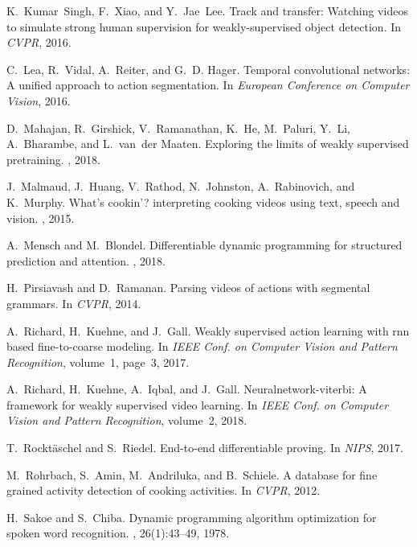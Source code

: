 \documentclass[10pt,twocolumn,letterpaper]{article}
\begin{document}
{\begin{thebibliography}{10}
K.~Kumar~Singh, F.~Xiao, and Y.~Jae~Lee.
\newblock Track and transfer: Watching videos to simulate strong human
  supervision for weakly-supervised object detection.
\newblock In {\em CVPR}, 2016.

C.~Lea, R.~Vidal, A.~Reiter, and G.~D. Hager.
\newblock Temporal convolutional networks: A unified approach to action
  segmentation.
\newblock In {\em European Conference on Computer Vision}, 2016.

D.~Mahajan, R.~Girshick, V.~Ramanathan, K.~He, M.~Paluri, Y.~Li, A.~Bharambe,
  and L.~van~der Maaten.
\newblock Exploring the limits of weakly supervised pretraining.
, 2018.

J.~Malmaud, J.~Huang, V.~Rathod, N.~Johnston, A.~Rabinovich, and K.~Murphy.
\newblock What's cookin'? interpreting cooking videos using text, speech and
  vision.
, 2015.

A.~Mensch and M.~Blondel.
\newblock Differentiable dynamic programming for structured prediction and
  attention.
, 2018.

H.~Pirsiavash and D.~Ramanan.
\newblock Parsing videos of actions with segmental grammars.
\newblock In {\em CVPR}, 2014.

A.~Richard, H.~Kuehne, and J.~Gall.
\newblock Weakly supervised action learning with rnn based fine-to-coarse
  modeling.
\newblock In {\em IEEE Conf. on Computer Vision and Pattern Recognition},
  volume~1, page~3, 2017.

A.~Richard, H.~Kuehne, A.~Iqbal, and J.~Gall.
\newblock Neuralnetwork-viterbi: A framework for weakly supervised video
  learning.
\newblock In {\em IEEE Conf. on Computer Vision and Pattern Recognition},
  volume~2, 2018.

T.~Rockt{\"a}schel and S.~Riedel.
\newblock End-to-end differentiable proving.
\newblock In {\em NIPS}, 2017.

M.~Rohrbach, S.~Amin, M.~Andriluka, and B.~Schiele.
\newblock A database for fine grained activity detection of cooking activities.
\newblock In {\em CVPR}, 2012.

H.~Sakoe and S.~Chiba.
\newblock Dynamic programming algorithm optimization for spoken word
  recognition.
,
  26(1):43--49, 1978.


\end{thebibliography}}
\end{document}
